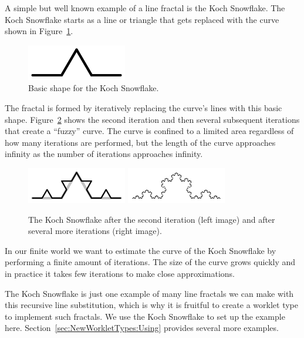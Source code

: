A simple but well known example of a line fractal is the  Koch Snowflake.
The Koch Snowflake starts as a line or triangle that gets replaced with the curve shown in Figure~\ref{fig:KochShape}.

\begin{figure}[htb]
  \centering
  \includegraphics[scale=2]{images/Koch1.pdf}
  \caption{Basic shape for the Koch Snowflake.}
  \label{fig:KochShape}
\end{figure}

The fractal is formed by iteratively replacing the curve's lines with this basic shape.
Figure~\ref{fig:KochIterations} shows the second iteration and then several subsequent iterations that create a ``fuzzy'' curve.
The curve is confined to a limited area regardless of how many iterations are performed, but the length of the curve approaches infinity as the number of iterations approaches infinity.

\begin{figure}[htb]
  \centering
  \includegraphics[scale=2]{images/Koch2.pdf}
  \includegraphics[scale=2]{images/Koch5.pdf}
  \caption{
    The Koch Snowflake after the second iteration (left image) and after several more iterations (right image).
  }
  \label{fig:KochIterations}
\end{figure}

In our finite world we want to estimate the curve of the Koch Snowflake by performing a finite amount of iterations.
The size of the curve grows quickly and in practice it takes few iterations to make close approximations.

\begin{didyouknow}
  The Koch Snowflake is just one example of many line fractals we can make with this recursive line substitution, which is why it is fruitful to create a worklet type to implement such fractals.
  We use the Koch Snowflake to set up the example here.
  Section~\ref{sec:NewWorkletTypes:Using} provides several more examples.
\end{didyouknow}

